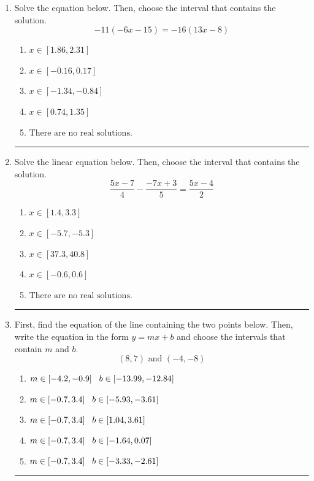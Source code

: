 \documentclass[14pt]{extbook}
\newcommand{\litem}[1]{\item#1\hspace*{-1cm}\rule{\textwidth}{0.4pt}}
\begin{document}
\begin{enumerate}
{\begin{enumerate}[label=\Alph*.]
\end{enumerate} }
\litem{
Solve the equation below. Then, choose the interval that contains the solution.\[ -11(-6x -15) = -16(13x -8) \]\begin{enumerate}[label=\Alph*.]
\item \( x \in [1.86, 2.31] \)
\item \( x \in [-0.16, 0.17] \)
\item \( x \in [-1.34, -0.84] \)
\item \( x \in [0.74, 1.35] \)
\item \( \text{There are no real solutions.} \)

\end{enumerate} }
\litem{
Solve the linear equation below. Then, choose the interval that contains the solution.\[ \frac{5x -7}{4} - \frac{-7x + 3}{5} = \frac{5x -4}{2} \]\begin{enumerate}[label=\Alph*.]
\item \( x \in [1.4, 3.3] \)
\item \( x \in [-5.7, -5.3] \)
\item \( x \in [37.3, 40.8] \)
\item \( x \in [-0.6, 0.6] \)
\item \( \text{There are no real solutions.} \)

\end{enumerate} }
\litem{
First, find the equation of the line containing the two points below. Then, write the equation in the form $ y=mx+b $ and choose the intervals that contain $m$ and $b$.\[ (8, 7) \text{ and } (-4, -8) \]\begin{enumerate}[label=\Alph*.]
\item \( m \in [-4.2, -0.9] \hspace*{3mm} b \in [-13.99, -12.84] \)
\item \( m \in [-0.7, 3.4] \hspace*{3mm} b \in [-5.93, -3.61] \)
\item \( m \in [-0.7, 3.4] \hspace*{3mm} b \in [1.04, 3.61] \)
\item \( m \in [-0.7, 3.4] \hspace*{3mm} b \in [-1.64, 0.07] \)
\item \( m \in [-0.7, 3.4] \hspace*{3mm} b \in [-3.33, -2.61] \)


\end{enumerate}}
\end{enumerate}
\end{document}
